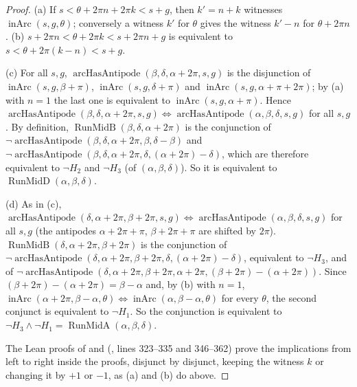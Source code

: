 \begin{proof}
(a) If $s<\theta+2\pi n+2\pi k<s+g$, then $k'=n+k$ witnesses $\operatorname{inArc}(s,g,\theta)$; conversely a
witness $k'$ for $\theta$ gives the witness $k'-n$ for $\theta+2\pi n$.
(b) $s+2\pi n<\theta+2\pi k<s+2\pi n+g$ is equivalent to $s<\theta+2\pi(k-n)<s+g$.

(c) For all $s,g$, $\operatorname{arcHasAntipode}(\beta,\delta,\alpha+2\pi,s,g)$ is the disjunction of
$\operatorname{inArc}(s,g,\beta+\pi)$, $\operatorname{inArc}(s,g,\delta+\pi)$ and
$\operatorname{inArc}(s,g,\alpha+\pi+2\pi)$; by (a) with $n=1$ the last one is equivalent to
$\operatorname{inArc}(s,g,\alpha+\pi)$. Hence
$\operatorname{arcHasAntipode}(\beta,\delta,\alpha+2\pi,s,g)\iff\operatorname{arcHasAntipode}(\alpha,\beta,\delta,s,g)$
for all $s,g$. By definition, $\operatorname{RunMidB}(\beta,\delta,\alpha+2\pi)$ is the conjunction of
$\neg\operatorname{arcHasAntipode}(\beta,\delta,\alpha+2\pi,\beta,\delta-\beta)$ and
$\neg\operatorname{arcHasAntipode}(\beta,\delta,\alpha+2\pi,\delta,(\alpha+2\pi)-\delta)$, which are therefore
equivalent to $\neg H_2$ and $\neg H_3$ (of $(\alpha,\beta,\delta)$). So it is equivalent to
$\operatorname{RunMidD}(\alpha,\beta,\delta)$.

(d) As in (c), $\operatorname{arcHasAntipode}(\delta,\alpha+2\pi,\beta+2\pi,s,g)\iff
\operatorname{arcHasAntipode}(\alpha,\beta,\delta,s,g)$ for all $s,g$ (the antipodes
$\alpha+2\pi+\pi$, $\beta+2\pi+\pi$ are shifted by $2\pi$). $\operatorname{RunMidB}(\delta,\alpha+2\pi,\beta+2\pi)$
is the conjunction of $\neg\operatorname{arcHasAntipode}(\delta,\alpha+2\pi,\beta+2\pi,\delta,(\alpha+2\pi)-\delta)$,
equivalent to $\neg H_3$, and of
$\neg\operatorname{arcHasAntipode}(\delta,\alpha+2\pi,\beta+2\pi,\alpha+2\pi,(\beta+2\pi)-(\alpha+2\pi))$. Since
$(\beta+2\pi)-(\alpha+2\pi)=\beta-\alpha$ and, by (b) with $n=1$,
$\operatorname{inArc}(\alpha+2\pi,\beta-\alpha,\theta)\iff\operatorname{inArc}(\alpha,\beta-\alpha,\theta)$ for
every $\theta$, the second conjunct is equivalent to $\neg H_1$. So the conjunction is equivalent to
$\neg H_3\wedge\neg H_1=\operatorname{RunMidA}(\alpha,\beta,\delta)$.

The Lean proofs of  and 
(, lines 323--335 and 346--362) prove the implications from left to right
inside the proofs, disjunct by disjunct, keeping the witness $k$ or changing it by $+1$ or $-1$, as (a) and (b)
do above.
\end{proof}

